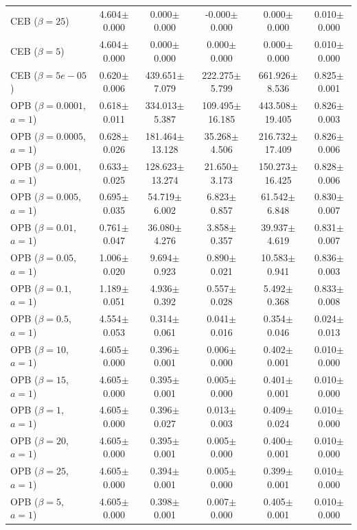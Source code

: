 \begin{table}[t]
{\begin{tabular}{l c c c c c}
CEB ($\beta=25$) & 4.604$\pm$0.000 & 0.000$\pm$0.000 & -0.000$\pm$0.000 & 0.000$\pm$0.000 & 0.010$\pm$0.000 \\
CEB ($\beta=5$) & 4.604$\pm$0.000 & 0.000$\pm$0.000 & 0.000$\pm$0.000 & 0.000$\pm$0.000 & 0.010$\pm$0.000 \\
CEB ($\beta=5e-05$) & 0.620$\pm$0.006 & 439.651$\pm$7.079 & 222.275$\pm$5.799 & 661.926$\pm$8.536 & 0.825$\pm$0.001 \\
OPB ($\beta=0.0001$, $a=1$) & 0.618$\pm$0.011 & 334.013$\pm$5.387 & 109.495$\pm$16.185 & 443.508$\pm$19.405 & 0.826$\pm$0.003 \\
OPB ($\beta=0.0005$, $a=1$) & 0.628$\pm$0.026 & 181.464$\pm$13.128 & 35.268$\pm$4.506 & 216.732$\pm$17.409 & 0.826$\pm$0.006 \\
OPB ($\beta=0.001$, $a=1$) & 0.633$\pm$0.025 & 128.623$\pm$13.274 & 21.650$\pm$3.173 & 150.273$\pm$16.425 & 0.828$\pm$0.006 \\
OPB ($\beta=0.005$, $a=1$) & 0.695$\pm$0.035 & 54.719$\pm$6.002 & 6.823$\pm$0.857 & 61.542$\pm$6.848 & 0.830$\pm$0.007 \\
OPB ($\beta=0.01$, $a=1$) & 0.761$\pm$0.047 & 36.080$\pm$4.276 & 3.858$\pm$0.357 & 39.937$\pm$4.619 & 0.831$\pm$0.007 \\
OPB ($\beta=0.05$, $a=1$) & 1.006$\pm$0.020 & 9.694$\pm$0.923 & 0.890$\pm$0.021 & 10.583$\pm$0.941 & 0.836$\pm$0.003 \\
OPB ($\beta=0.1$, $a=1$) & 1.189$\pm$0.051 & 4.936$\pm$0.392 & 0.557$\pm$0.028 & 5.492$\pm$0.368 & 0.833$\pm$0.008 \\
OPB ($\beta=0.5$, $a=1$) & 4.554$\pm$0.053 & 0.314$\pm$0.061 & 0.041$\pm$0.016 & 0.354$\pm$0.046 & 0.024$\pm$0.013 \\
OPB ($\beta=10$, $a=1$) & 4.605$\pm$0.000 & 0.396$\pm$0.001 & 0.006$\pm$0.000 & 0.402$\pm$0.001 & 0.010$\pm$0.000 \\
OPB ($\beta=15$, $a=1$) & 4.605$\pm$0.000 & 0.395$\pm$0.001 & 0.005$\pm$0.000 & 0.401$\pm$0.001 & 0.010$\pm$0.000 \\
OPB ($\beta=1$, $a=1$) & 4.605$\pm$0.000 & 0.396$\pm$0.027 & 0.013$\pm$0.003 & 0.409$\pm$0.024 & 0.010$\pm$0.000 \\
OPB ($\beta=20$, $a=1$) & 4.605$\pm$0.000 & 0.395$\pm$0.001 & 0.005$\pm$0.000 & 0.400$\pm$0.001 & 0.010$\pm$0.000 \\
OPB ($\beta=25$, $a=1$) & 4.605$\pm$0.000 & 0.394$\pm$0.001 & 0.005$\pm$0.000 & 0.399$\pm$0.001 & 0.010$\pm$0.000 \\
OPB ($\beta=5$, $a=1$) & 4.605$\pm$0.000 & 0.398$\pm$0.001 & 0.007$\pm$0.000 & 0.405$\pm$0.001 & 0.010$\pm$0.000 \\

\end{tabular}}
\end{table}
